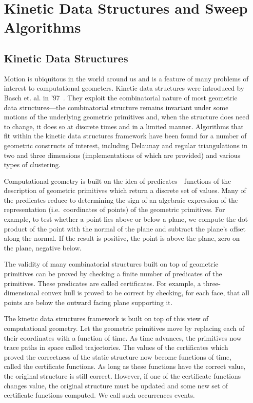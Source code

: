 \section{Kinetic Data Structures and Sweep Algorithms}
\label{sec:kds_intro}


\subsection{Kinetic Data Structures}
Motion is ubiquitous in the world around us and is a feature of many
problems of interest to computational geometers. Kinetic data
structures were introduced by Basch et. al. in
'97~\cite{Basch97}. They exploit the combinatorial nature of most
geometric data structures---the combinatorial structure remains
invariant under some motions of the underlying geometric primitives
and, when the structure does need to change, it does so at discrete
times and in a limited manner. Algorithms that fit within the kinetic
data structures framework have been found for a number of geometric
constructs of interest, including Delaunay and regular triangulations
in two and three dimensions (implementations of which are provided)
and various types of clustering.

Computational geometry is built on the idea of
predicates---functions of the description of geometric
primitives which return a discrete set of values. Many of the
predicates reduce to determining the sign of an algebraic expression
of the representation (i.e.\ coordinates of points) of the geometric
primitives. For example, to test whether a point lies above or below a
plane, we compute the dot product of the point with the normal of the
plane and subtract the plane's offset along the normal. If the result
is positive, the point is above the plane, zero on the plane, negative
below.

The validity of many combinatorial structures built on top of
geometric primitives can be proved by checking a finite number of
predicates of the primitives. These predicates are called 
  certificates. For example, a three-dimensional convex hull is
proved to be correct by checking, for each face, that all points are
below the outward facing plane supporting it.

The kinetic data structures framework is built on top of this view of
computational geometry. Let the geometric primitives move by replacing
each of their coordinates with a function of time. As time advances,
the primitives now trace paths in space called trajectories. The
values of the certificates which proved the correctness of the static
structure now become functions of time, called the certificate
  functions. As long as these functions have the correct value, the
original structure is still correct. However, if one of the
certificate functions changes value, the original structure must be
updated and some new set of certificate functions computed. We call
such occurrences events.

